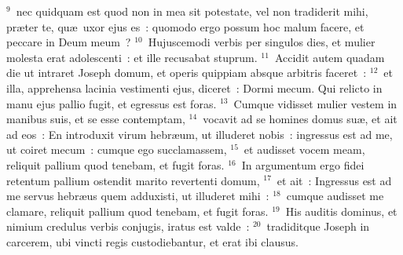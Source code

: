${}^{9}$~nec quidquam est quod non in mea sit potestate, vel non tradiderit mihi, pr\ae ter te, qu\ae\ uxor ejus es~: quomodo ergo possum hoc malum facere, et peccare in Deum meum~?
${}^{10}$~Hujuscemodi verbis per singulos dies, et mulier molesta erat adolescenti~: et ille recusabat stuprum.
${}^{11}$~Accidit autem quadam die ut intraret Joseph domum, et operis quippiam absque arbitris faceret~:
${}^{12}$~et illa, apprehensa lacinia vestimenti ejus, diceret~: Dormi mecum. Qui relicto in manu ejus pallio fugit, et egressus est foras.
${}^{13}$~Cumque vidisset mulier vestem in manibus suis, et se esse contemptam,
${}^{14}$~vocavit ad se homines domus su\ae , et ait ad eos~: En introduxit virum hebr\ae um, ut illuderet nobis~: ingressus est ad me, ut coiret mecum~: cumque ego succlamassem,
${}^{15}$~et audisset vocem meam, reliquit pallium quod tenebam, et fugit foras.
${}^{16}$~In argumentum ergo fidei retentum pallium ostendit marito revertenti domum,
${}^{17}$~et ait~: Ingressus est ad me servus hebr\ae us quem adduxisti, ut illuderet mihi~:
${}^{18}$~cumque audisset me clamare, reliquit pallium quod tenebam, et fugit foras.
${}^{19}$~His auditis dominus, et nimium credulus verbis conjugis, iratus est valde~:
${}^{20}$~tradiditque Joseph in carcerem, ubi vincti regis custodiebantur, et erat ibi clausus.


